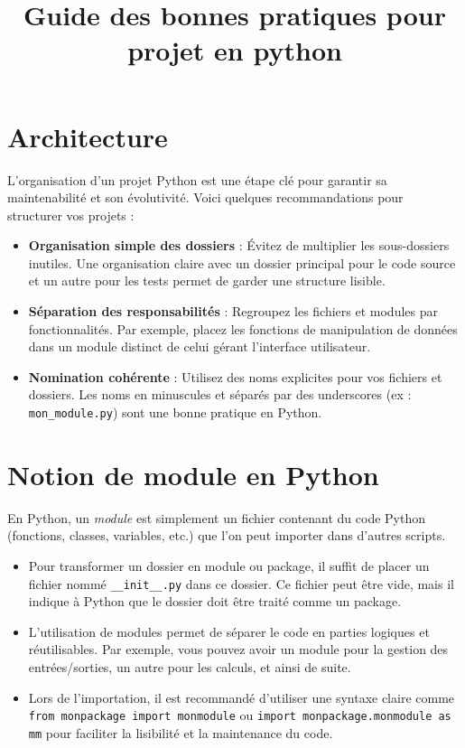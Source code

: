 \documentclass[a4paper,12pt]{article}
\title{Guide des bonnes pratiques pour projet en python}
\author{}
\date{}
\begin{document}
\maketitle

\section{Architecture}

L'organisation d'un projet Python est une étape clé pour garantir sa maintenabilité et son évolutivité. 
Voici quelques recommandations pour structurer vos projets :

\begin{itemize}
    \item \textbf{Organisation simple des dossiers} : Évitez de multiplier les sous-dossiers inutiles. Une organisation claire avec un dossier principal pour le code source et un autre pour les tests permet de garder une structure lisible.
    \item \textbf{Séparation des responsabilités} : Regroupez les fichiers et modules par fonctionnalités. Par exemple, placez les fonctions de manipulation de données dans un module distinct de celui gérant l'interface utilisateur.
    \item \textbf{Nomination cohérente} : Utilisez des noms explicites pour vos fichiers et dossiers. Les noms en minuscules et séparés par des underscores (ex : \texttt{mon\_module.py}) sont une bonne pratique en Python.
\end{itemize}

\section{Notion de module en Python}

En Python, un \emph{module} est simplement un fichier contenant du code Python (fonctions, classes, variables, etc.) que l'on peut importer dans d'autres scripts. 

\begin{itemize}
    \item Pour transformer un dossier en module ou package, il suffit de placer un fichier nommé \texttt{\_\_init\_\_.py} dans ce dossier. Ce fichier peut être vide, mais il indique à Python que le dossier doit être traité comme un package.
    \item L'utilisation de modules permet de séparer le code en parties logiques et réutilisables. Par exemple, vous pouvez avoir un module pour la gestion des entrées/sorties, un autre pour les calculs, et ainsi de suite.
    \item Lors de l'importation, il est recommandé d'utiliser une syntaxe claire comme \texttt{from monpackage import monmodule} ou \texttt{import monpackage.monmodule as mm} pour faciliter la lisibilité et la maintenance du code.
\end{itemize}
\end{document}
